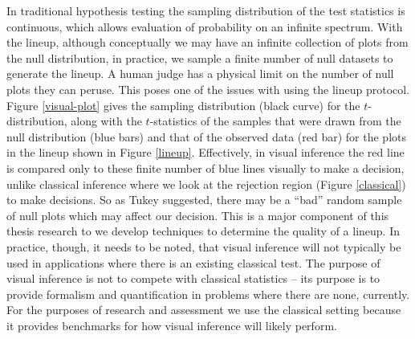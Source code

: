 In traditional hypothesis testing the sampling distribution of the test statistics is continuous, which allows evaluation of probability on an infinite spectrum. With the lineup, although conceptually we may have an infinite collection of plots from the null distribution, in practice, we sample a finite number of null datasets to generate the lineup. A human judge has a physical limit on the number of null plots they can peruse. This poses one of the issues with using the lineup protocol.  Figure \ref{visual-plot} gives the sampling distribution (black curve) for the $t$-distribution, along with the $t$-statistics of the samples that were drawn from the null distribution (blue bars) and that of the observed data (red bar) for the plots in the lineup shown in Figure \ref{lineup}. Effectively,  in visual inference the red line is compared only to these finite number of blue lines visually to make a decision, unlike classical inference where we look at the rejection region (Figure \ref{classical}) to make decisions. So as Tukey suggested, there may be a ``bad'' random sample of null plots which may affect our decision. This is a major component of this thesis research to we develop techniques to determine the quality of a lineup. In practice, though, it needs to be noted, that visual inference will not typically be used in applications where there is an existing classical test. The purpose of visual inference is not to compete with classical statistics -- its purpose is to provide formalism and quantification in problems where there are none, currently. For the purposes of research and assessment we use the classical setting because it provides benchmarks for how visual inference will likely perform.

 


